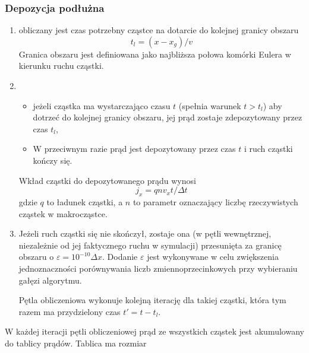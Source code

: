     \subsubsection{Depozycja podłużna}
    \begin{enumerate}
        \item obliczany jest czas potrzebny cząstce na dotarcie do kolejnej
        granicy obszaru
        \begin{equation}
            t_l = (x - x_g)/v
        \end{equation}
        Granica obszaru jest definiowana jako najbliższa połowa komórki Eulera w kierunku
        ruchu cząstki.
        \item
        \begin{itemize}
            \item jeżeli cząstka ma wystarczająco czasu $t$ (spełnia warunek $t > t_l$) aby
            dotrzeć do kolejnej granicy obszaru, jej prąd zostaje zdepozytowany przez czas $t_l$,
            \item W przeciwnym razie prąd jest depozytowany przez czas $t$ i ruch cząstki kończy się.
        \end{itemize}
        Wkład cząstki do depozytowanego prądu wynosi
        \begin{equation}
            j_x = q n v_x t/\Delta t
        \end{equation}
        gdzie $q$ to ładunek cząstki, a $n$ to parametr  oznaczający liczbę
        rzeczywistych cząstek w makrocząstce.

        \item Jeżeli ruch cząstki się nie skończył, zostaje ona (w pętli
        wewnętrznej, niezależnie od jej faktycznego ruchu w symulacji)
         przesunięta za granicę obszaru o $\varepsilon =
        10^{-10} \Delta x$. Dodanie $\varepsilon$ jest wykonywane w celu zwiększenia
        jednoznaczności porównywania liczb zmiennoprzecinkowych przy wybieraniu
        gałęzi algorytmu.

        Pętla obliczeniowa wykonuje kolejną iterację dla takiej cząstki, która tym razem
        ma przydzielony czas $t' = t - t_l$.

    \end{enumerate}

    W każdej iteracji pętli obliczeniowej prąd ze wszystkich cząstek jest
    akumulowany do tablicy prądów. Tablica ma rozmiar  

